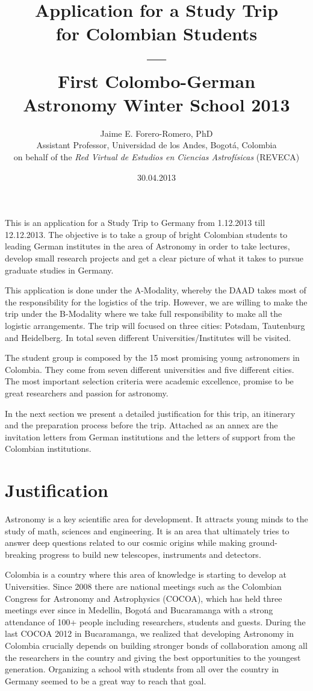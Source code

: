 \documentclass[12pt]{article}
\title{Application for a Study Trip \\ for Colombian
  Students\\---\\ First Colombo-German \\ Astronomy Winter School 2013}
\author{Jaime E. Forero-Romero, PhD \\ {\small Assistant Professor, Universidad de los Andes, Bogot\'a, Colombia}\\
{\small on behalf of the {\textit{Red Virtual de Estudios en Ciencias Astrof\'isicas}} (REVECA)}}
\date{30.04.2013}
\begin{document}
\maketitle
This is an application for a Study Trip to Germany from 1.12.2013 till
12.12.2013. The objective is to take a group of bright Colombian students to
leading German institutes in the area of Astronomy in order to take lectures,
develop small research projects and get a clear picture of what it
takes to pursue graduate studies in Germany. 

This application is done under the A-Modality, whereby the DAAD takes
most of the responsibility for the logistics of the trip. However, we
are willing to make the trip under the B-Modality where we take full
responsibility to make all the logistic arrangements. The trip will
focused on three cities: Potsdam, Tautenburg and Heidelberg. In total
seven different Universities/Institutes will be visited.

The student group is composed by the 15 most promising young
astronomers in Colombia. They come from seven different universities
and five different cities. The most important selection criteria were
academic excellence, promise to be great researchers and passion for
astronomy.  

In the next section we present a detailed justification for this trip,
an itinerary and the preparation process before the trip. Attached as
an annex are the invitation letters from German institutions and the
letters of support from the Colombian institutions.  

\newpage

\section{Justification}

Astronomy is a key scientific area for development. It attracts young
minds to the study of math, sciences and engineering. It is an area
that ultimately tries to answer deep questions related to our
cosmic origins while making ground-breaking progress to build new
telescopes, instruments and detectors.

Colombia is a country where this area of knowledge is starting to develop
at Universities. Since 2008 there are national meetings such as the
Colombian Congress for Astronomy and Astrophysics (COCOA), which has
held three meetings ever since in Medellin, Bogot\'a and Bucaramanga
with a strong attendance of 100+ people including researchers, students and guests. During the
last COCOA 2012 in Bucaramanga, we realized that developing Astronomy
in Colombia crucially depends on building stronger bonds of
collaboration among all the researchers in the country and giving the
best opportunities to the youngest generation. Organizing a school
with students from all over the country in Germany seemed to be a
great way to reach that goal. 
\end{document}
